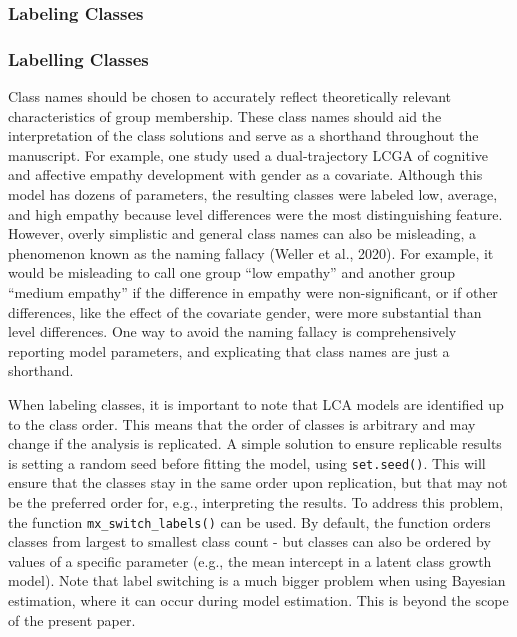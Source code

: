 \documentclass[
  ,man,floatsintext]{apa6}
\begin{document}
\hypertarget{labeling-classes}{%
\subsubsection{Labeling Classes}\label{labeling-classes}}

\hypertarget{labelling-classes}{%
\subsubsection{Labelling Classes}\label{labelling-classes}}

Class names should be chosen to accurately reflect theoretically relevant characteristics of group membership.
These class names should aid the interpretation of the class solutions and serve as a shorthand throughout the manuscript.
For example, one study used a dual-trajectory LCGA of cognitive and affective empathy development with gender as a covariate.
Although this model has dozens of parameters,
the resulting classes were labeled low, average, and high empathy because level differences were the most distinguishing feature.
However, overly simplistic and general class names can also be misleading, a phenomenon known as the naming
fallacy (Weller et al., 2020).
For example, it would be misleading to call one group ``low empathy'' and another group ``medium empathy'' if the difference in empathy were non-significant,
or if other differences, like the effect of the covariate gender, were more substantial than level differences.
One way to avoid the naming fallacy is comprehensively reporting model parameters,
and explicating that class names are just a shorthand.

When labeling classes, it is important to note that LCA models are identified up to the class order.
This means that the order of classes is arbitrary and may change if the analysis is replicated.
A simple solution to ensure replicable results is setting a random seed before fitting the model, using \texttt{set.seed()}.
This will ensure that the classes stay in the same order upon replication,
but that may not be the preferred order for, e.g., interpreting the results.
To address this problem, the function \texttt{mx\_switch\_labels()} can be used.
By default, the function orders classes from largest to smallest class count - but classes can also be ordered by values of a specific parameter (e.g., the mean intercept in a latent class growth model).
Note that label switching is a much bigger problem when using Bayesian estimation,
where it can occur during model estimation.
This is beyond the scope of the present paper.
\end{document}
